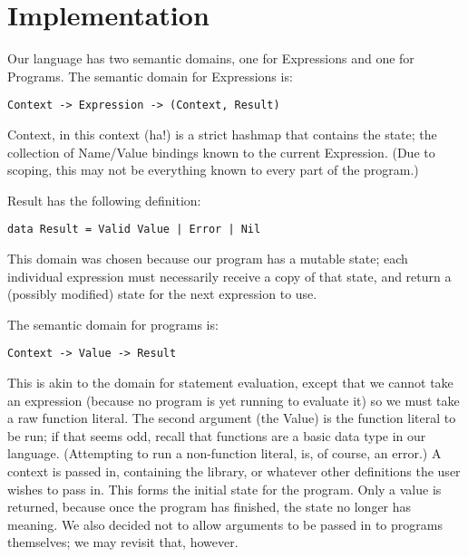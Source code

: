 \documentclass{article}
\begin{document}
\section*{Implementation}

Our language has two semantic domains, one for Expressions and one for Programs.  The semantic domain for Expressions is:

\begin{lstlisting}
Context -> Expression -> (Context, Result)
\end{lstlisting}

Context, in this context (ha!) is a strict hashmap that contains the state; the collection of Name/Value bindings known to the current Expression.  (Due to scoping, this may not be everything known to every part of the program.)

Result has the following definition:

\begin{lstlisting}
data Result = Valid Value | Error | Nil
\end{lstlisting}

This domain was chosen because our program has a mutable state; each individual expression must necessarily receive a copy of that state, and return a (possibly modified) state for the next expression to use.

The semantic domain for programs is:

\begin{lstlisting}
Context -> Value -> Result
\end{lstlisting}

This is akin to the domain for statement evaluation, except that we cannot take an expression (because no program is yet running to evaluate it) so we must take a raw function literal. The second argument (the Value) is the function literal to be run; if that seems odd, recall that functions are a basic data type in our language. (Attempting to run a non-function literal, is, of course, an error.)  A context is passed in, containing the library, or whatever other definitions the user wishes to pass in.  This forms the initial state for the program. Only a value is returned, because once the program has finished, the state no longer has meaning.  We also decided not to allow arguments to be passed in to programs themselves; we may revisit that, however.
\end{document}
